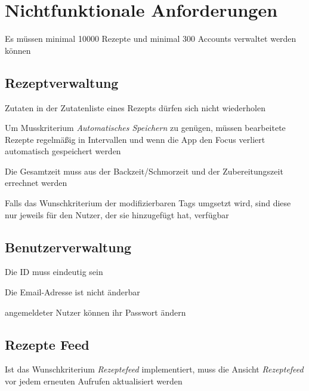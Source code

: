 \chapter{Nichtfunktionale Anforderungen}

Es müssen minimal 10000 Rezepte und minimal 300 Accounts verwaltet werden können

\section {Rezeptverwaltung}

Zutaten in der Zutatenliste eines Rezepts dürfen sich nicht wiederholen

Um Musskriterium {\em Automatisches Speichern} zu genügen, müssen bearbeitete Rezepte regelmäßig in Intervallen und wenn die App den Focus verliert automatisch gespeichert werden

Die Gesamtzeit muss aus der \gls{Backzeit/Schmorzeit} und der \gls{Zubereitungszeit} errechnet werden

Falls das Wunschkriterium der modifizierbaren Tags umgsetzt wird, sind diese nur jeweils für den Nutzer, der sie hinzugefügt hat, verfügbar

\section{Benutzerverwaltung}
	
Die \gls{ID} muss eindeutig sein


Die Email-Adresse ist nicht änderbar

\Gls{angemeldeter Nutzer} können ihr Passwort ändern


\section{Rezepte Feed}

Ist das Wunschkriterium {\em Rezeptefeed} implementiert, muss die Ansicht {\em Rezeptefeed} vor jedem erneuten Aufrufen aktualisiert werden
